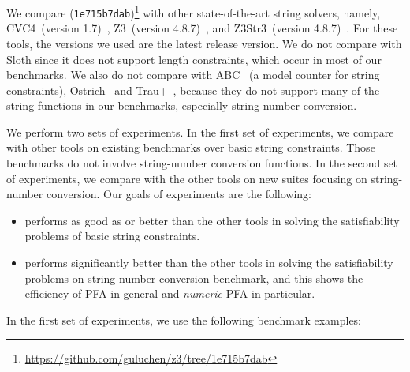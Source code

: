We compare {\tool} (\texttt{1e715b7dab})\footnote{\url{https://github.com/guluchen/z3/tree/1e715b7dab}} with other state-of-the-art string solvers, namely, CVC4~(version 1.7)~\cite{cvc4Tool}, Z3~(version 4.8.7)~\cite{z3}, and \textsf{Z3Str3}~(version 4.8.7)~\cite{zheng2013z3}. For these tools, the versions we used are the latest release version. 
We do not compare with Sloth \cite{sloth} since it does not support length constraints, which occur in most of our benchmarks. We also do not compare with ABC~\cite{aydin2018parameterized} (a model counter for string constraints), Ostrich~\cite{chen2019decision} and \textsf{Trau+}~\cite{abdulla2019chain}, because they do not support many of the string functions in our benchmarks, especially string-number conversion.

We perform two sets of experiments. In the first set of experiments, we compare {\tool} with other tools on existing benchmarks over basic string constraints. Those benchmarks do not involve string-number conversion functions. In the second set of experiments, we compare {\tool} with the other tools on new suites focusing on string-number conversion. Our goals of experiments are the following:
\smallskip


\begin{itemize}
	\item {\tool} performs as good as or better than the other tools in solving the  satisfiability problems of basic string constraints.
	
		\smallskip

	\item {\tool} performs significantly better than the other tools in solving the satisfiability problems on string-number conversion benchmark, and this shows  the efficiency of PFA in general and \emph{numeric} PFA in particular.
\end{itemize}
		\smallskip

In the first set of experiments, we use the following benchmark examples:

		\smallskip


